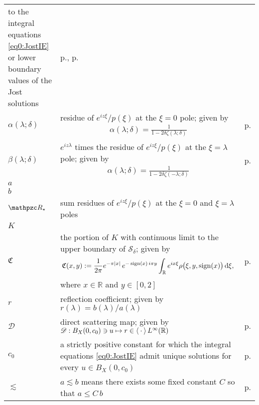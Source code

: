 \documentclass[../dissertation.tex]{subfiles}
\begin{document}
\begin{centering}
\begin{longtable}{R{.115\textwidth}|L{.74\textwidth}|C{.145\textwidth}}
		to the integral equations \eqref{eq0:JostIE} or lower boundary 
		values of the Jost solutions
		& p.\pageref{eq0:JostIE}, p.\pageref{defn0:jost} \\
	$\alpha(\lambda; \delta)$ & residue of $e^{iz\xi}/p(\xi)$ at the $\xi=0$
		pole; given by 
		{\begin{align*}
			\alpha(\lambda; \delta)
				= \frac{1}{1-2\delta\zeta(\lambda; \delta)}
		\end{align*}}
		& p.\pageref{sym:alphabeta} \\
	$\beta(\lambda; \delta)$ & $e^{iz\lambda}$ times the residue of 
		$e^{iz\xi}/p(\xi)$ at the $\xi=\lambda$ pole; given by 
		{\begin{align*}
			\alpha(\lambda; \delta)
				= \frac{1}{1-2\delta\zeta(-\lambda; \delta)}
		\end{align*}}
		& p.\pageref{sym:alphabeta} \\
	$a$ & & \\
	$b$ & & \\
	$\mathpzc R_\star$ & sum residues of $e^{iz\xi}/p(\xi)$ at the $\xi=0$ and $\xi=\lambda$ 
		poles & \\
	$K$ & & \\
	$\mathfrak C$ & the portion of $K$ with continuous limit to the upper 
		boundary of $\mathcal S_\delta$; given by 
		{
			\begin{align*}
				\mathfrak C(x,y)
					:= \frac{1}{2\pi} e^{-\pi|x|} \, e^{- \operatorname{sign}(x) \, i \pi y }
						\int_{\mathbb R} e^{ix \xi} \rho\big(\xi, y, \operatorname{sign}(x)\big) \, \mathrm{d}\xi,
			\end{align*}
		}
		where $x \in \mathbb R$ and $y\in [0, 2]$
		& p.\pageref{sym:mathfrakC} \\
	$r$ & reflection coefficient; given by $r(\lambda) = b(\lambda) / a(\lambda)$ 
		& \\
	$\mathscr D$ 
		& direct scattering map; given by  
		$\mathscr D: B_X(0,c_0) \ni u \mapsto r \in \left\langle \kern 0.5ex \cdot \kern 0.5ex \right\rangle L^\infty(\mathbb R)$
		& p.\pageref{sym:DM} \\
	$c_0$ & a strictly positive constant for which the integral equations \ref{eq0:JostIE}
		admit unique solutions for every $u \in B_X(0, c_0)$ 
		& p.\pageref{prop4:exist} \\
	$\lesssim$ & $a \lesssim b$ means there exists some fixed constant $C$ so 
		that $a \leq C\,b$ & p.\pageref{sym:lesssim} \\
\end{longtable}
\end{centering}
\end{document}
